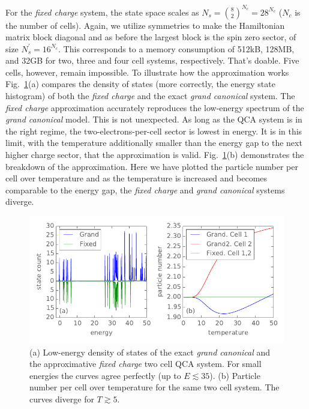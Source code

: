 For the \emph{fixed charge} system, the state space scales as $N_s =
\binom{8}{2}^{N_c} = 28^{N_c}$ ($N_c$ is the number of cells). Again, we utilize
symmetries to make the Hamiltonian matrix block diagonal and as before the
largest block is the spin zero sector, of size $N_s^{\prime} = 16^{N_c}$. This
corresponds to a memory consumption of 512kB, 128MB, and 32GB for two, three and
four cell systems, respectively. That's doable. Five cells, however, remain
impossible. To illustrate how the approximation works
Fig.~\ref{fig:fixed_charge_approximation}(a) compares the density of states
(more correctly, the energy state histogram) of both the \emph{fixed charge}
and the exact \emph{grand canonical} system. The \emph{fixed charge}
approximation accurately reproduces the low-energy spectrum of the \emph{grand
canonical} model. This is not unexpected. As long as the QCA system is in the
right regime, the two-electrons-per-cell sector is lowest in energy. It is in
this limit, with the temperature additionally smaller than the energy gap to the
next higher charge sector, that the approximation is valid.
Fig.~\ref{fig:fixed_charge_approximation}(b) demonstrates the breakdown of the
approximation. Here we have plotted the particle number per cell over
temperature and as the temperature is increased and becomes comparable to the
energy gap, the \emph{fixed charge} and \emph{grand canonical} systems diverge.
%
\begin{figure}
  \center
  \includegraphics{fixed_charge_approximation}
  \caption{(a) Low-energy density of states of the exact \emph{grand canonical}
  and the approximative \emph{fixed charge} two cell QCA system. For small
  energies the curves agree perfectly (up to $E \lesssim 35$). (b) Particle
  number per cell over temperature for the same two cell system. The curves
  diverge for $T \gtrsim 5$.}
  \label{fig:fixed_charge_approximation}
\end{figure}
%


